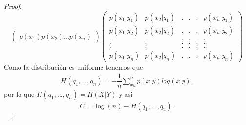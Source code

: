 \begin{proof}
$$\begin{pmatrix}
p(x_1)
p(x_2) 
\text{.}
\text{.}
\text{.}
p(x_n)
\end{pmatrix}
\begin{pmatrix}
p(x_1|y_1) & p(x_2|y_1) & \text{.} & \text{.} &\text{.} & p(x_n|y_1)\\
p(x_1|y_2) & p(x_2|y_2) & \text{.} & \text{.} &\text{.} & p(x_n|y_2)\\
\text{.} & \text{.}  & \text{.} & \text{.} &\text{.} & \text{.} \\
\text{.} & \text{.}  & \text{.} & \text{.} &\text{.} & \text{.} \\
\text{.} & \text{.}  & \text{.} & \text{.} &\text{.} & \text{.} \\
p(x_1|y_n) & p(x_2|y_n) & \text{.} & \text{.} &\text{.} & p(x_n|y_n)
\end{pmatrix}
$$
Como la distribución es uniforme tenemos que
\begin{align*}
     H(q_1, \dots, q_n)=-\dfrac{1}{n}\sum_{xy}^{n} p(x|y)log(x|y)
 .\end{align*} 
 por lo que $H(q_1, \dots, q_n)=H(X|Y)$ y asi
 \begin{align*}
    C = \log(n) -H(q_1, \dots, q_n) .
\end{align*}


\end{proof}
